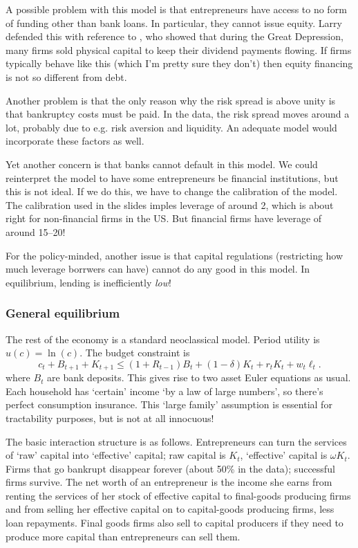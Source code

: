 \documentclass[11pt,letterpaper,reqno,oneside]{article}
\begin{document}
A possible problem with this model is that entrepreneurs have access to no form of funding other than bank loans. In particular, they cannot issue equity. Larry defended this with reference to \textcite{ColeOhanian1999}, who showed that during the Great Depression, many firms sold physical capital to keep their dividend payments flowing. If firms typically behave like this (which I'm pretty sure they don't) then equity financing is not so different from debt.

Another problem is that the only reason why the risk spread is above unity is that bankruptcy costs must be paid. In the data, the risk spread moves around a lot, probably due to e.g. risk aversion and liquidity. An adequate model would incorporate these factors as well.

Yet another concern is that banks cannot default in this model. We could reinterpret the model to have some entrepreneurs be financial institutions, but this is not ideal. If we do this, we have to change the calibration of the model. The calibration used in the slides imples leverage of around 2, which is about right for non-financial firms in the US. But financial firms have leverage of around 15--20!

For the policy-minded, another issue is that capital regulations (restricting how much leverage borrwers can have) cannot do any good in this model. In equilibrium, lending is inefficiently \emph{low}!



\subsubsection{General equilibrium}
\label{sec:02Dec2015:CSV:GE}

The rest of the economy is a standard neoclassical model. Period utility is $u(c)= \ln(c)$. The budget constraint is
%
\begin{equation*}
	c_t + B_{t+1} + K_{t+1} \leq (1+R_{t-1})B_t + (1-\delta)K_t + r_t K_t + w_t \ell_t .
\end{equation*}
%
where $B_t$ are bank deposits. This gives rise to two asset Euler equations as usual. Each household has `certain' income `by a law of large numbers', so there's perfect consumption insurance. This `large family' assumption is essential for tractability purposes, but is not at all innocuous!


The basic interaction structure is as follows. Entrepreneurs can turn the services of `raw' capital into `effective' capital; raw capital is $K_t$, `effective' capital is $\omega K_t$. Firms that go bankrupt disappear forever (about 50\% in the data); successful firms survive. The net worth of an entrepreneur is the income she earns from renting the services of her stock of effective capital to final-goods producing firms and from selling her effective capital on to capital-goods producing firms, less loan repayments. Final goods firms also sell to capital producers if they need to produce more capital than entrepreneurs can sell them.
\end{document}
